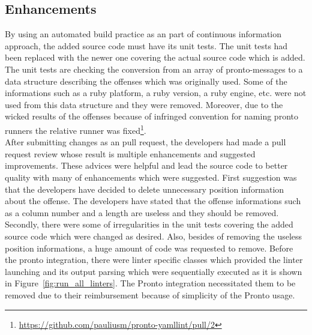 \subsection{Enhancements}

By using an automated build practice as an part of continuous information approach, the added source code must have its unit tests. The unit tests had been replaced with the newer one covering the actual source code which is added. The unit tests are checking the conversion from an array of pronto-messages to a data structure describing the offenses which was originally used. Some of the informations such as a ruby platform, a ruby version, a ruby engine, etc. were not used from this data structure and they were removed. Moreover, due to the wicked results of the offenses because of infringed convention for naming pronto runners the relative runner was fixed\footnote{\url{https://github.com/pauliusm/pronto-yamllint/pull/2}}.\\

After submitting changes as an pull request, the developers had made a pull request review whose result is multiple enhancements and suggested improvements. These advices were helpful and lead the source code to better quality with many of enhancements which were suggested. First suggestion was that the developers have decided to delete unnecessary position information about the offense. The developers have stated that the offense informations such as a column number and a length are useless and they should be removed. Secondly, there were some of irregularities in the unit tests covering the added source code which were changed as desired. Also, besides of removing the useless position informations, a huge amount of code was requested to remove. Before the pronto integration, there were linter specific classes which provided the linter launching and its output parsing which were sequentially executed as it is shown in Figure~\ref{fig:run_all_linters}. The Pronto integration necessitated them to be removed due to their reimbursement because of simplicity of the Pronto usage.\\

